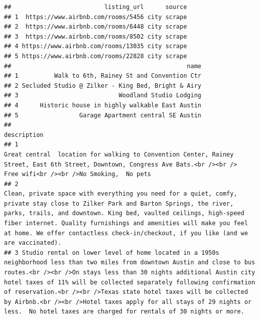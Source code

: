 \documentclass[
]{article}
\begin{document}
\begin{verbatim}
##                          listing_url      source
## 1  https://www.airbnb.com/rooms/5456 city scrape
## 2  https://www.airbnb.com/rooms/6448 city scrape
## 3  https://www.airbnb.com/rooms/8502 city scrape
## 4 https://www.airbnb.com/rooms/13035 city scrape
## 5 https://www.airbnb.com/rooms/22828 city scrape
##                                                 name
## 1          Walk to 6th, Rainey St and Convention Ctr
## 2 Secluded Studio @ Zilker - King Bed, Bright & Airy
## 3                            Woodland Studio Lodging
## 4      Historic house in highly walkable East Austin
## 5                 Garage Apartment central SE Austin
##                                                                                                                                                                                                                                                                                                                                                                                                                                                                                   description
## 1                                                                                                                                                                                                                                                                                                               Great central  location for walking to Convention Center, Rainey Street, East 6th Street, Downtown, Congress Ave Bats.<br /><br />  Free wifi<br /><br />No Smoking,  No pets
## 2                                                                                                                           Clean, private space with everything you need for a quiet, comfy, private stay close to Zilker Park and Barton Springs, the river, parks, trails, and downtown. King bed, vaulted ceilings, high-speed fiber internet. Quality furnishings and amenities will make you feel at home. We offer contactless check-in/checkout, if you like (and we are vaccinated).
## 3 Studio rental on lower level of home located in a 1950s neighborhood less than two miles from downtown Austin and close to bus routes.<br /><br />On stays less than 30 nights additional Austin city hotel taxes of 11% will be collected separately following confirmation of reservation.<br /><br />Texas state hotel taxes will be collected by Airbnb.<br /><br />Hotel taxes apply for all stays of 29 nights or less.  No hotel taxes are charged for rentals of 30 nights or more.

\end{verbatim}
\end{document}

